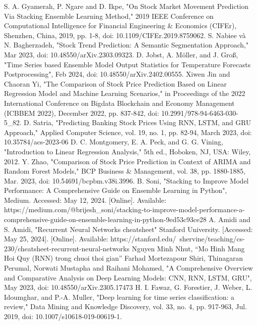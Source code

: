 \documentclass{ieeeojies}
\begin{document}
\begin{thebibliography}{00}
 S. A. Gyamerah, P. Ngare and D. Ikpe, "On Stock Market Movement Prediction Via Stacking Ensemble Learning Method," 2019 IEEE Conference on Computational Intelligence for Financial Engineering \& Economics (CIFEr), Shenzhen, China, 2019, pp. 1-8, doi: 10.1109/CIFEr.2019.8759062.
 S. Nabiee và N. Bagherzadeh, "Stock Trend Prediction: A Semantic Segmentation Approach,"  Mar 2023, doi: 10.48550/arXiv.2303.09323.
 D. Jobst, A. Möller, and J. Groß, "Time Series based Ensemble Model Output Statistics for Temperature Forecasts Postprocessing", Feb 2024, doi: 10.48550/arXiv.2402.00555.
 Xiwen Jin and Chaoran Yi, "The Comparison of Stock Price Prediction Based on Linear Regression Model and Machine Learning Scenarios," in Proceedings of the 2022 International Conference on Bigdata Blockchain and Economy Management (ICBBEM 2022), December 2022, pp. 837-842, doi: 10.2991/978-94-6463-030-5\_82.
 D. Satria, "Predicting Banking Stock Prices Using RNN, LSTM, and GRU Approach," Applied Computer Science, vol. 19, no. 1, pp. 82-94, March 2023, doi: 10.35784/acs-2023-06
 D. C. Montgomery, E. A. Peck, and G. G. Vining, "Introduction to Linear Regression Analysis," 5th ed., Hoboken, NJ, USA: Wiley, 2012.
 Y. Zhao, "Comparison of Stock Price Prediction in Context of ARIMA and Random Forest Models," BCP Business \& Management, vol. 38, pp. 1880-1885, Mar. 2023, doi: 10.54691/bcpbm.v38i.3996.
 B. Soni, "Stacking to Improve Model Performance: A Comprehensive Guide on Ensemble Learning in Python", Medium. Accessed: May 12, 2024. [Online]. Available: https://medium.com/@brijesh\_soni/stacking-to-improve-model-performance-a-comprehensive-guide-on-ensemble-learning-in-python-9ed53c93ce28
 A. Amidi and S. Amidi, "Recurrent Neural Networks cheatsheet" Stanford University. [Accessed: May 25, 2024]. [Online]. Available: https://stanford.edu/~shervine/teaching/cs-230/cheatsheet-recurrent-neural-networks
 Nguyen Minh Nhut, “Mo Hinh Mang Hoi Quy (RNN) trong chuoi thoi gian”
 Farhad Mortezapour Shiri, Thinagaran Perumal, Norwati Mustapha and Raihani Mohamed, "A Comprehensive Overview and Comparative Analysis on Deep Learning Models: CNN, RNN, LSTM, GRU", May 2023, doi: 10.48550/arXiv.2305.17473
 H. I. Fawaz, G. Forestier, J. Weber, L. Idoumghar, and P.-A. Muller, "Deep learning for time series classification: a review," Data Mining and Knowledge Discovery, vol. 33, no. 4, pp. 917-963, Jul. 2019, doi: 10.1007/s10618-019-00619-1.




\end{thebibliography}


\EOD
\end{document}
